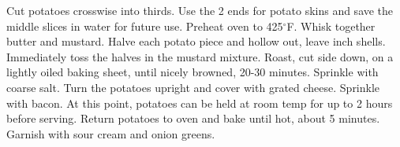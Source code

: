 \begin{minipage}{\linewidth}
\end{minipage}\par\begin{minipage}{\linewidth}  
{Cut potatoes crosswise into thirds. Use the 2 ends for potato skins and save the middle slices in water for future use. Preheat oven to 425$^\circ$F. Whisk together butter and mustard. Halve each potato piece and hollow out, leave  inch shells. Immediately toss the halves in the mustard mixture. Roast, cut side down, on a lightly oiled baking sheet, until nicely browned, 20-30 minutes. Sprinkle with coarse salt. Turn the potatoes upright and cover with grated cheese. Sprinkle with bacon. At this point, potatoes can be held at room temp for up to 2 hours before serving. Return potatoes to oven and bake until hot, about 5 minutes. Garnish with sour cream and onion greens.}



\end{minipage}
